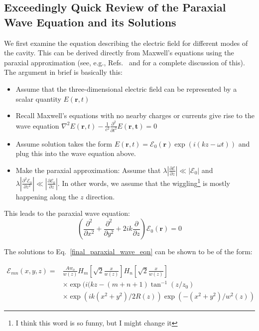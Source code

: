 \subsection{Exceedingly Quick Review of the Paraxial Wave Equation and its Solutions}

We first examine the equation describing the electric field for different modes of the cavity. This can be derived directly from Maxwell's equations using the paraxial approximation (see, e.g., Refs.\ \cite{lasersMilonniEberly} and \cite{bergeson_amo_notes} for a complete discussion of this). The argument in brief is basically this: 

\begin{itemize}
\item Assume that the three-dimensional electric field can be represented by a scalar quantity $E(\mathbf{r},t)$
\item Recall Maxwell's equations with no nearby charges or currents give rise to the wave equation $\nabla^2E(\mathbf{r},t)-\frac{1}{c^2} \frac{\partial^2}{\partial t^2} E(\mathbf{r,t})=0$
\item Assume solution takes the form $E(\mathbf{r},t) = \mathcal{E}_0(\mathbf{r}) \exp(i(kz-\omega t))$ and plug this into the wave equation above. 
\item Make the paraxial approximation: Assume that $\lambda \left|\frac{\partial \mathcal{E}}{\partial z} \right| \ll |\mathcal{E}_0|$ and $\lambda \left| \frac{\partial^2\mathcal{E}_0}{\partial z^2}\right| \ll \left| \frac{\partial \mathcal{E}_0}{\partial z}\right|$. In other words, we assume that the wiggling\footnote{I think this word is so funny, but I might change it} is mostly happening along the $z$ direction. 
\end{itemize}

This leads to the paraxial wave equation: 
\begin{equation}
\left(\frac{\partial^2}{\partial x^2}+\frac{\partial^2}{\partial y^2}+2ik\frac{\partial}{\partial z}\right) \mathcal{E}_0(\mathbf{r})=0 \label{final_paraxial_wave_eqn}
\end{equation}

The solutions to Eq.\ \ref{final_paraxial_wave_eqn} can be shown to be of the form:

\begin{align} \label{solutionToParaxial}
\mathcal{E}_{mn}(x,y,z)=&\frac{Aw_o}{w(z)}H_m\left[\sqrt{2}\frac{x}{w(z)}\right]H_n\left[\sqrt{2}\frac{x}{w(z)}\right] \\
&\times \exp(i(kz-(m+n+1)\tan^{-1}(z/z_0)\\
&\times \exp(ik(x^2+y^2)/2R(z)) \exp(-(x^2+y^2)/w^2(z))
\end{align}

